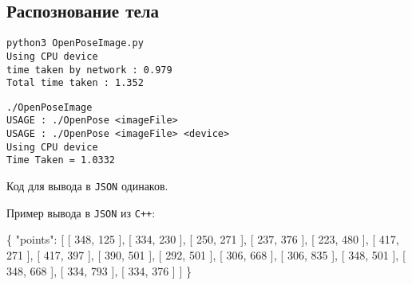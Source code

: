 \documentclass[
  12pt,
  a4paper,
]{article}
\newenvironment{Shaded}{}{}
\newcommand{\DataTypeTok}[1]{\textcolor[rgb]{0.56,0.13,0.00}{#1}}
\newcommand{\DecValTok}[1]{\textcolor[rgb]{0.25,0.63,0.44}{#1}}
\newcommand{\FunctionTok}[1]{\textcolor[rgb]{0.02,0.16,0.49}{#1}}
\newcommand{\OtherTok}[1]{\textcolor[rgb]{0.00,0.44,0.13}{#1}}
\begin{document}
\hypertarget{ux440ux430ux441ux43fux43eux437ux43dux43eux432ux430ux43dux438ux435-ux442ux435ux43bux430}{%
\subsection{Распознование
тела}\label{ux440ux430ux441ux43fux43eux437ux43dux43eux432ux430ux43dux438ux435-ux442ux435ux43bux430}}

\begin{verbatim}
python3 OpenPoseImage.py 
Using CPU device
time taken by network : 0.979
Total time taken : 1.352
\end{verbatim}

\begin{verbatim}
./OpenPoseImage 
USAGE : ./OpenPose <imageFile> 
USAGE : ./OpenPose <imageFile> <device>
Using CPU device
Time Taken = 1.0332
\end{verbatim}

Код для вывода в \texttt{JSON} одинаков.

Пример вывода в \texttt{JSON} из \texttt{C++}:

\begin{Shaded}
\begin{Highlighting}[]
\FunctionTok{\{}
    \DataTypeTok{"points"}\FunctionTok{:} \OtherTok{[}
        \OtherTok{[} \DecValTok{348}\OtherTok{,} \DecValTok{125} \OtherTok{],}
        \OtherTok{[} \DecValTok{334}\OtherTok{,} \DecValTok{230} \OtherTok{],}
        \OtherTok{[} \DecValTok{250}\OtherTok{,} \DecValTok{271} \OtherTok{],}
        \OtherTok{[} \DecValTok{237}\OtherTok{,} \DecValTok{376} \OtherTok{],}
        \OtherTok{[} \DecValTok{223}\OtherTok{,} \DecValTok{480} \OtherTok{],}
        \OtherTok{[} \DecValTok{417}\OtherTok{,} \DecValTok{271} \OtherTok{],}
        \OtherTok{[} \DecValTok{417}\OtherTok{,} \DecValTok{397} \OtherTok{],}
        \OtherTok{[} \DecValTok{390}\OtherTok{,} \DecValTok{501} \OtherTok{],}
        \OtherTok{[} \DecValTok{292}\OtherTok{,} \DecValTok{501} \OtherTok{],}
        \OtherTok{[} \DecValTok{306}\OtherTok{,} \DecValTok{668} \OtherTok{],}
        \OtherTok{[} \DecValTok{306}\OtherTok{,} \DecValTok{835} \OtherTok{],}
        \OtherTok{[} \DecValTok{348}\OtherTok{,} \DecValTok{501} \OtherTok{],}
        \OtherTok{[} \DecValTok{348}\OtherTok{,} \DecValTok{668} \OtherTok{],}
        \OtherTok{[} \DecValTok{334}\OtherTok{,} \DecValTok{793} \OtherTok{],}
        \OtherTok{[} \DecValTok{334}\OtherTok{,} \DecValTok{376} \OtherTok{]}
    \OtherTok{]}
\FunctionTok{\}}
\end{Highlighting}
\end{Shaded}
\end{document}
